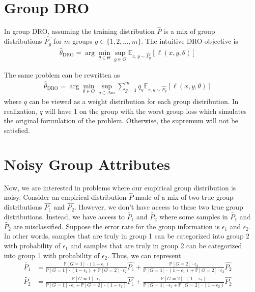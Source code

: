 \documentclass{article}
\newcommand{\prob}{\mathbb{P}}
\begin{document}
    \section{Group DRO}
    In group DRO, assuming the training distribution $\hat{P}$ is a mix of group distributions $\hat{P_g}$ for $m$ groups $g \in \{ 1, 2, ..., m \}$. The intuitive DRO objective is
    \begin{align*}
        \hat{\theta}_{\text{DRO}} = \arg \min_{\theta \in \Theta} \sup_{g \in G} \mathbb{E}_{x, y \sim \hat{P_g}} [\ell(x, y, \theta)]
    \end{align*}

    The same problem can be rewritten as
    \begin{align*}
        \hat{\theta}_{\text{DRO}} = \arg \min_{\theta \in \Theta} \sup_{q \in \Delta m} \sum_{g=1}^{m} q_g \mathbb{E}_{x, y \sim \hat{P_g}} [\ell(x, y, \theta)]
    \end{align*}
    where $q$ can be viewed as a weight distribution for each group distribution. In realization, $q$ will have 1 on the group with the worst group loss which simulates the original formulation of the problem. Otherwise, the supremum will not be satisfied.

    \section{Noisy Group Attributes}
    Now, we are interested in problems where our empirical group distribution is noisy. Consider an empirical distribution $\hat{P}$ made of a mix of two true group distributions $\hat{P_1}$ and $\hat{P_2}$. However, we don't have access to these two true group distributions. Instead, we have access to $\tilde{P_1}$ and $\tilde{P_2}$ where some samples in $\tilde{P_1}$ and $\tilde{P_2}$ are misclassified. Suppose the error rate for the group information is $\epsilon_1$ and $\epsilon_2$. In other words, samples that are truly in group 1 can be categorized into group 2 with probability of $\epsilon_1$ and samples that are truly in group 2 can be categorized into group 1 with probability of $\epsilon_2$. Thus, we can represent 
    \begin{align*}
        \tilde{P_1} &= \frac{\prob[G = 1] \cdot (1 - \epsilon_1)}{\prob[G = 1] \cdot (1 - \epsilon_1) + \prob[G = 2] \cdot \epsilon_2} \hat{P_1} + \frac{\prob[G = 2] \cdot \epsilon_2}{\prob[G = 1] \cdot (1 - \epsilon_1) + \prob[G = 2] \cdot \epsilon_2} \hat{P_2}
        \\ \tilde{P_2} &= \frac{\prob[G = 1] \cdot \epsilon_1}{\prob[G = 1] \cdot \epsilon_1 + \prob[G = 2] \cdot (1 - \epsilon_2)} \hat{P_1} + \frac{\prob[G = 2] \cdot (1 - \epsilon_2)}{\prob[G = 1] \cdot \epsilon_1 + \prob[G = 2] \cdot (1 - \epsilon_2)} \hat{P_2}
    \end{align*}
\end{document}
